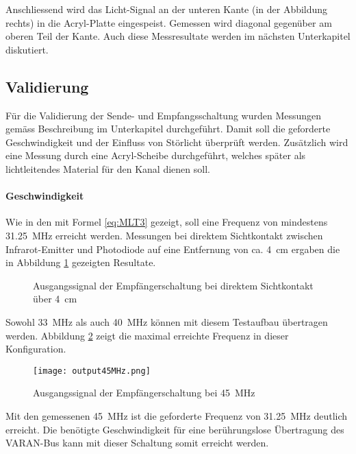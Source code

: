 Anschliessend wird das Licht-Signal an der unteren Kante (in der Abbildung rechts) in die Acryl-Platte eingespeist. Gemessen wird diagonal gegenüber am oberen Teil der Kante. Auch diese Messresultate werden im nächsten Unterkapitel diskutiert.

\subsection{Validierung} 
\label{subsec:Validierung}
Für die Validierung der Sende- und Empfangsschaltung wurden Messungen gemäss Beschreibung im Unterkapitel  durchgeführt. Damit soll die geforderte Geschwindigkeit und der Einfluss von Störlicht überprüft werden. Zusätzlich wird eine Messung durch eine Acryl-Scheibe durchgeführt, welches später als lichtleitendes Material für den Kanal dienen soll.
 
\paragraph{Geschwindigkeit}
Wie in den  mit Formel \ref{eq:MLT3} gezeigt, soll eine Frequenz von mindestens \SI{31.25}{MHz} erreicht werden. Messungen bei direktem Sichtkontakt zwischen Infrarot-Emitter und Photodiode auf eine Entfernung von ca. \SI{4}{cm} ergaben die in Abbildung \ref{fig:output33_40} gezeigten Resultate.

\begin{figure}[h!]
	\centering
	\qquad
	\caption{Ausgangssignal der Empfängerschaltung bei direktem Sichtkontakt über \SI{4}{cm}}
	\label{fig:output33_40}
\end{figure}

Sowohl \SI{33}{MHz} als auch \SI{40}{MHz} können mit diesem Testaufbau übertragen werden. Abbildung \ref{fig:output45} zeigt die maximal erreichte Frequenz in dieser Konfiguration.


\begin{figure}[h!]
	\centering
	\texttt{[image: output45MHz.png]}
	\caption{Ausgangssignal der Empfängerschaltung bei \SI{45}{MHz}}
	\label{fig:output45}
\end{figure}

Mit den gemessenen \SI{45}{MHz} ist die geforderte Frequenz von \SI{31.25}{MHz} deutlich erreicht. Die benötigte Geschwindigkeit für eine berührungslose Übertragung des VARAN-Bus kann mit dieser Schaltung somit erreicht werden.

